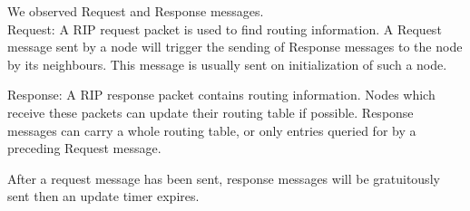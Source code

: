 We observed Request and Response messages. \\
Request:
\indent A RIP request packet is used to find routing information. A Request message sent by a node will trigger the sending of Response messages to the node by its neighbours. This message is usually sent on initialization of such a node.
    
Response:
\indent A RIP response packet contains routing information. Nodes which receive these packets can update their routing table if possible. Response messages can carry a whole routing table, or only entries queried for by a preceding Request message.

After a request message has been sent, response messages will be gratuitously sent then an update timer expires.
